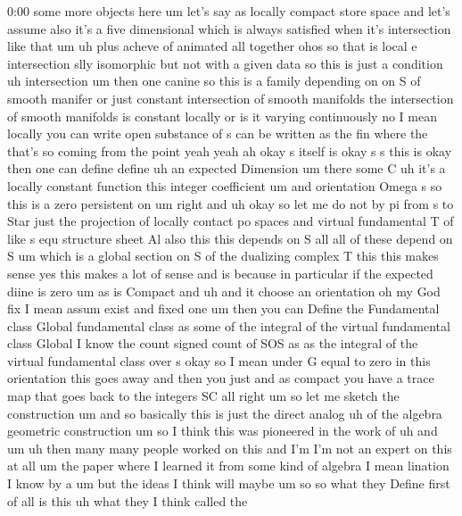 \begin{unfinished}{0:00}
some  more  objects
here
um  let's  say  as  locally  compact  store
space
and  let's  assume  also  it's  a  five
dimensional  which  is  always  satisfied
when  it's  intersection  like  that  um
uh  plus
acheve  of  animated  all
together
ohos  so  that  is  local  e
intersection  slly  isomorphic  but  not
with  a  given  data  so  this  is  just  a
condition  uh
intersection
um  then  one
canine  so  this  is  a  family  depending  on
on  S  of  smooth  manifer  or  just  constant
intersection  of  smooth
manifolds  the  intersection  of  smooth
manifolds  is  constant  locally  or  is  it
varying
continuously  no  I  mean  locally  you  can
write  open  substance  of  s  can  be  written
as  the
fin  where  the  that's  so  coming  from  the
point  yeah
yeah  ah  okay  s  itself  is  okay  s  s  this
is
okay  then  one  can  define  define
uh  an  expected
Dimension  um  there  some  C  uh  it's  a
locally  constant  function  this  integer
coefficient  um  and
orientation  Omega  s  so  this  is  a  zero
persistent
on
um  right
and  uh  okay  so  let  me  do  not  by  pi  from
s  to  Star  just  the  projection  of  locally
contact  po
spaces  and  virtual  fundamental  T  of  like
s  equ  structure  sheet  Al  also  this  this
depends  on
S  all  all  of  these  depend  on  S
um  which  is  a  global  section  on  S  of  the
dualizing
complex
T  this  this  makes  sense
yes  this  makes  a  lot  of  sense  and  is
because  in
particular  if  the  expected  diine  is
zero
um  as  is
Compact  and  uh  and  it  choose  an
orientation  oh  my  God
fix  I  mean  assum  exist  and  fixed  one  um
then  you  can
Define  the  Fundamental
class  Global  fundamental  class  as  some
of  the  integral  of  the  virtual
fundamental
class
Global  I  know  the  count  signed  count  of
SOS  as  as  the  integral  of  the  virtual
fundamental
class  over
s
okay  so  I  mean  under  G  equal  to  zero  in
this  orientation  this  goes  away  and  then
you  just  and  as  compact  you  have  a  trace
map  that  goes  back  to  the
integers
SC
all  right  um  so  let  me  sketch  the
construction  um  and  so  basically  this  is
just  the  direct
analog  uh  of  the  algebra  geometric
construction
um  so  I  think  this  was  pioneered  in  the
work  of  uh
and
um  uh  then  many  many  people  worked  on
this  and  I'm  I'm  not  an  expert  on  this
at  all  um  the  paper  where  I  learned  it
from  some  kind  of  algebra  I  mean
lination  I  know  by  a  um  but  the  ideas  I
think  will  maybe
um  so  so  what  they  Define  first  of  all
is  this  uh  what  they  I  think  called  the

\end{unfinished}
